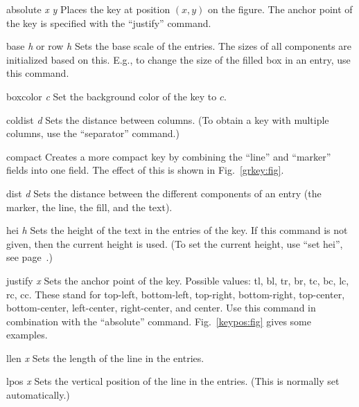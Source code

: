 \begin{commanddescription}
\item[{\sf absolute} {\it x} {\it y}]
Places the key at position $(x, y)$ on the figure. The anchor point of the key is specified with the ``justify'' command.

\item[{\sf base} {\it h} or {\sf row} {\it h}]
Sets the base scale of the entries. The sizes of all components are initialized based on this. E.g., to change the size of the filled box in an entry, use this command.

\item[{\sf boxcolor} {\it c}]
Set the background color of the key to $c$.

\item[{\sf coldist} {\it d}]
Sets the distance between columns. (To obtain a key with multiple columns, use the ``separator'' command.)

\item[{\sf compact}]
Creates a more compact key by combining the ``line'' and ``marker'' fields into one field. The effect of this is shown in Fig.~\ref{grkey:fig}.

\item[{\sf dist} {\it d}]
Sets the distance between the different components of an entry (the marker, the line, the fill, and the text).

\item[{\sf hei} {\it h}]
Sets the height of the text in the entries of the key. If this command is not given, then the current height is used. (To set the current height, use ``set hei'', see page~\pageref{shei:cmd}.)

\item[{\sf justify} {\it x}]
Sets the anchor point of the key. Possible values: tl, bl, tr, br, tc, bc, lc, rc, cc. These stand for top-left, bottom-left, top-right, bottom-right, top-center, bottom-center, left-center, right-center, and center. Use this command in combination with the ``absolute'' command. Fig.~\ref{keypos:fig} gives some examples.

\item[{\sf llen} {\it x}]
Sets the length of the line in the entries.

\item[{\sf lpos} {\it x}]
Sets the vertical position of the line in the entries. (This is normally set automatically.)


\end{commanddescription}
